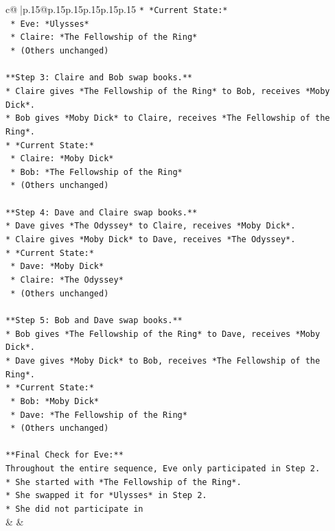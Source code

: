 \documentclass{article}
\begin{document}
{\begin{supertabular}{c@{$\;$}|p{.15\linewidth}@{}p{.15\linewidth}p{.15\linewidth}p{.15\linewidth}p{.15\linewidth}p{.15\linewidth}}
{{{\texttt{*   *Current State:*} \\
\texttt{    *   Eve: *Ulysses*} \\
\texttt{    *   Claire: *The Fellowship of the Ring*} \\
\texttt{    *   (Others unchanged)} \\
\\ 
\texttt{**Step 3: Claire and Bob swap books.**} \\
\texttt{*   Claire gives *The Fellowship of the Ring* to Bob, receives *Moby Dick*.} \\
\texttt{*   Bob gives *Moby Dick* to Claire, receives *The Fellowship of the Ring*.} \\
\texttt{*   *Current State:*} \\
\texttt{    *   Claire: *Moby Dick*} \\
\texttt{    *   Bob: *The Fellowship of the Ring*} \\
\texttt{    *   (Others unchanged)} \\
\\ 
\texttt{**Step 4: Dave and Claire swap books.**} \\
\texttt{*   Dave gives *The Odyssey* to Claire, receives *Moby Dick*.} \\
\texttt{*   Claire gives *Moby Dick* to Dave, receives *The Odyssey*.} \\
\texttt{*   *Current State:*} \\
\texttt{    *   Dave: *Moby Dick*} \\
\texttt{    *   Claire: *The Odyssey*} \\
\texttt{    *   (Others unchanged)} \\
\\ 
\texttt{**Step 5: Bob and Dave swap books.**} \\
\texttt{*   Bob gives *The Fellowship of the Ring* to Dave, receives *Moby Dick*.} \\
\texttt{*   Dave gives *Moby Dick* to Bob, receives *The Fellowship of the Ring*.} \\
\texttt{*   *Current State:*} \\
\texttt{    *   Bob: *Moby Dick*} \\
\texttt{    *   Dave: *The Fellowship of the Ring*} \\
\texttt{    *   (Others unchanged)} \\
\\ 
\texttt{**Final Check for Eve:**} \\
\texttt{Throughout the entire sequence, Eve only participated in Step 2.} \\
\texttt{*   She started with *The Fellowship of the Ring*.} \\
\texttt{*   She swapped it for *Ulysses* in Step 2.} \\
\texttt{*   She did not participate in} \\
            }
        }
    }
    & & \\ \\


\end{supertabular}}
\end{document}
